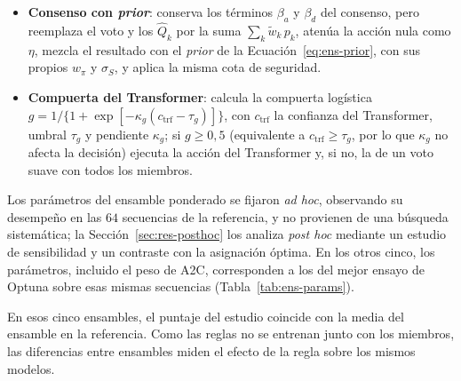 \documentclass[../00_Main/Main.tex]{subfiles}
\begin{document}
\begin{itemize}
    $\sum_k c_k \hat Q_k(a)$.
    \item \textbf{Consenso con \emph{prior}}: conserva los t\'erminos
    $\beta_a$ y $\beta_d$ del consenso, pero
    reemplaza el voto y los $\hat Q_k$ por la suma $\sum_k \tilde w_k\, p_k$,
    aten\'ua la acci\'on nula como $\eta$, mezcla el resultado con el
    \emph{prior} de la Ecuaci\'on~\eqref{eq:ens-prior}, con sus propios $w_\pi$
    y $\sigma_S$, y aplica la misma cota de seguridad.
    \item \textbf{Compuerta del Transformer}: calcula la compuerta
    log\'istica $g = 1/\{1 + \exp[-\kappa_g (c_{\mathrm{trf}} - \tau_g)]\}$,    con $c_{\mathrm{trf}}$ la confianza del Transformer, umbral $\tau_g$ y
    pendiente $\kappa_g$; si $g \ge 0{,}5$ (equivalente a
    $c_{\mathrm{trf}} \ge \tau_g$, por lo que $\kappa_g$ no afecta la decisi\'on)
    ejecuta la acci\'on del Transformer y, si no, la de un voto suave con todos los miembros.
\end{itemize}

Los par\'ametros del ensamble ponderado se fijaron \emph{ad hoc},
observando su desempe\~no en las $64$ secuencias de la referencia, y no
provienen de una b\'usqueda sistem\'atica; la
Secci\'on~\ref{sec:res-posthoc} los analiza \emph{post hoc} mediante un
estudio de sensibilidad y un contraste con la asignaci\'on \'optima. En los otros cinco, los par\'ametros, incluido el peso de A2C,
corresponden a los del mejor ensayo de Optuna sobre esas mismas
secuencias (Tabla~\ref{tab:ens-params}).

En esos cinco ensambles, el puntaje del estudio coincide con la media
del ensamble en la referencia. Como las reglas no se entrenan junto con
los miembros, las diferencias entre ensambles miden el efecto de la
regla sobre los mismos modelos.
\end{document}

